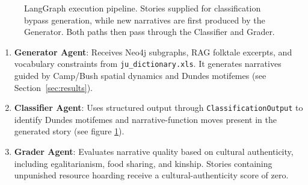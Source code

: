 \documentclass[pdflatex,sn-mathphys-num]{sn-jnl}%
\theoremstyle{thmstyleone}%
\theoremstyle{thmstyletwo}%
\theoremstyle{thmstylethree}%
\begin{document}
\begin{figure}[!tb]
\centering
{}
\caption{LangGraph execution pipeline. Stories supplied for classification bypass generation, while new narratives are first produced by the Generator. Both paths then pass through the Classifier and Grader.}
\label{fig:pipeline}
\end{figure}

\begin{enumerate}
\item \textbf{Generator Agent}: Receives Neo4j subgraphs, RAG folktale excerpts, and vocabulary constraints from \texttt{ju\_dictionary.xls}. It generates narratives guided by Camp/Bush spatial dynamics and Dundes motifemes (see Section~\ref{sec:results}).

\item \textbf{Classifier Agent}: Uses structured output through \texttt{ClassificationOutput} to identify Dundes motifemes and narrative-function moves present in the generated story (see figure \ref{fig:pipeline}).

\item \textbf{Grader Agent}: Evaluates narrative quality based on cultural authenticity, including egalitarianism, food sharing, and kinship. Stories containing unpunished resource hoarding receive a cultural-authenticity score of zero.
\end{enumerate}
\end{document}
